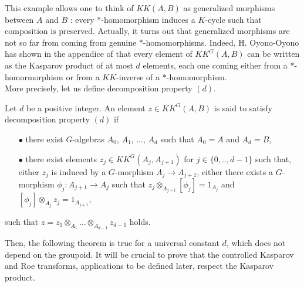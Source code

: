 
This example allows one to think of $KK(A,B)$ as generalized morphisms between $A$ and $B$ : every $*$-homomorphism induces a $K$-cycle such that composition is preserved. Actually, it turns out that generalized morphisms are not so far from coming from genuine $*$-homomorphisms. Indeed, H. Oyono-Oyono has shown in the appendice of \cite{LaffOY} that every element of $KK^G(A,B)$ can be written as the Kasparov product of at most $d$ elements, each one coming either from a $*$-homormorphism or from a $KK$-inverse of a $*$-homomorphism.\\


More precisely, let us define decomposition property $(d)$.

\begin{definition}
Let $d$ be a positive integer. An element $z\in KK^G(A,B)$ is said to satisfy decomposition property $(d)$ if
\begin{itemize}
\item[$\bullet$] there exist $G$-algebras $A_0$, $A_1$, ..., $A_d$ such that $A_0=A$ and $A_d=B$, 
\item[$\bullet$] there exist elements $z_j \in KK^G(A_{j},A_{j+1})$ for $j\in\{0,..,d-1\}$ such that, either $z_j$ is induced by a $G$-morphism $A_j \rightarrow A_{j+1}$, either there exists a $G$-morphism $\phi_j : A_{j+1}\rightarrow A_j$ such that $z_j \otimes_{A_{j+1}} [\phi_j] = 1_{A_j}$ and $ [\phi_j] \otimes_{A_{j}} z_j  = 1_{A_{j+1}}$,
\end{itemize}
such that $z = z_1 \otimes_{A_1}  ... \otimes_{A_{d-1}} z_{d-1} $ holds.
\end{definition}

Then, the following theorem is true for a universal constant $d$, which does not depend on the groupoid. It will be crucial to prove that the controlled Kasparov and Roe transforms, applications to be defined later, respect the Kasparov product. 

